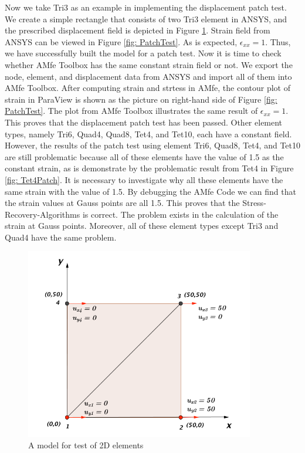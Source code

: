 Now we take Tri3 as an example in implementing the displacement patch test. We create a simple rectangle that consists of two Tri3 element in ANSYS, and the prescribed displacement field is depicted in Figure \ref{fig: PatchMuster}. Strain field from ANSYS can be viewed in Figure \ref{fig: PatchTest}. As is expected, $\epsilon_{xx} = 1$. Thus, we have successfully built the model for a patch test. Now it is time to check whether AMfe Toolbox has the same constant strain field or not. We export the node, element, and displacement data from ANSYS and import all of them into AMfe Toolbox. After computing strain and strtess in AMfe, the contour plot of strain in ParaView is shown as the picture on right-hand side of Figure \ref{fig: PatchTest}. The plot from AMfe Toolbox illustrates the same result of $\epsilon_ {xx} = 1$. This proves that the displacement patch test has been passed. Other element types,  namely Tri6, Quad4, Quad8, Tet4, and Tet10, each have a constant field. However, the results of the patch test using element Tri6, Quad8, Tet4, and Tet10 are still problematic because all of these elements have the value of 1.5 as the constant strain, as is demonstrate by the problematic result from Tet4 in Figure \ref{fig: Tet4Patch}. It is necessary to investigate why all these elements have the same strain with the value of 1.5.  By debugging the AMfe Code we can find that the strain values at Gauss points are all 1.5. This proves that the Stress-Recovery-Algorithms is correct. The problem exists in the calculation of the strain at Gauss points. Moreover, all of these element types except Tri3 and Quad4 have the same problem.   

\begin{figure}
	\begin{center}
		\includegraphics[width=10cm,clip]{PatchMuster.pdf} 			
		\caption{A model for test of 2D elements} \label{fig: PatchMuster}
	\end{center}
\end{figure}

